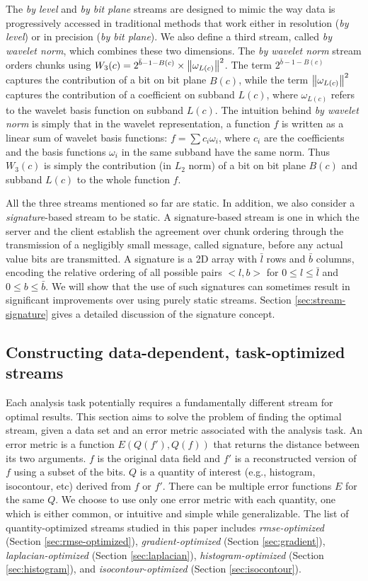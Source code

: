 The \emph{by level} and \emph{by bit plane} streams are designed to mimic the way data is progressively
accessed in traditional methods that work either in resolution (\emph{by level}) or in
precision (\emph{by bit plane}). We also define a third stream, called \emph{by
wavelet norm}, which combines these two dimensions. The \emph{by wavelet norm} stream orders chunks using
$W_3(c)=2^{\bar{b}-1-B(c)}\times \left\lVert\omega_{L(c)}\right\rVert^2$. The term $2^{\bar{b}-1-B(c)}$ captures the
contribution of a bit on bit plane $B(c)$, while the term $\left\lVert\omega_{L(c)}\right\rVert^2$ captures the
contribution of a coefficient on subband $L(c)$, where $\omega_{L(c)}$ refers to the wavelet basis
function on subband $L(c)$. The intuition behind \emph{by wavelet norm} is simply that in the
wavelet representation, a function $f$ is written as a linear sum of wavelet basis functions:
$f=\sum{c_i\omega_i}$, where $c_i$ are the coefficients and the basis functions $\omega_i$ in the
same subband have the same norm. Thus $W_3(c)$ is simply the contribution (in $L_2$ norm) of a bit
on bit plane $B(c)$ and subband $L(c)$ to the whole function $f$.

All the three streams mentioned so far are static. In addition, we also consider a
\emph{signature}-based stream to be static. A signature-based stream is one in which the server and
the client establish the agreement over chunk ordering through the transmission of a negligibly
small message, called signature, before any actual value bits are transmitted. A signature is a 2D
array with $\bar{l}$ rows and $\bar{b}$ columns, encoding the relative ordering of all possible
pairs $<l,b>$ for $0\leq l \leq \bar{l}$ and $0\leq b \leq \bar{b}$. We will show that the use of
such signatures can sometimes result in significant improvements over using purely static streams.
Section \ref{sec:stream-signature} gives a detailed discussion of the signature concept.

\subsection{Constructing data-dependent, task-optimized streams}
\label{sec:data_dep_streams}

Each analysis task potentially requires a fundamentally different stream for optimal results. This
section aims to solve the problem of finding the optimal stream, given a data set and
an error metric associated with the analysis task. An error metric is a function
$E(Q(f'),Q(f))$ that returns the distance between its two arguments. $f$ is the original data field
and $f'$ is a reconstructed version of $f$ using a subset of the bits. $Q$ is a quantity of interest
(e.g., histogram, isocontour, etc) derived from $f$ or $f'$. There can be multiple error functions
$E$ for the same $Q$. We choose to use only one error metric with
each quantity, one which is either common, or intuitive and simple while generalizable.
The list of quantity-optimized streams studied in this paper includes \emph{rmse-optimized} (Section
\ref{sec:rmse-optimized}), \emph{gradient-optimized} (Section \ref{sec:gradient}),
\emph{laplacian-optimized} (Section \ref{sec:laplacian}), \emph{histogram-optimized} (Section
\ref{sec:histogram}), and \emph{isocontour-optimized} (Section \ref{sec:isocontour}).


